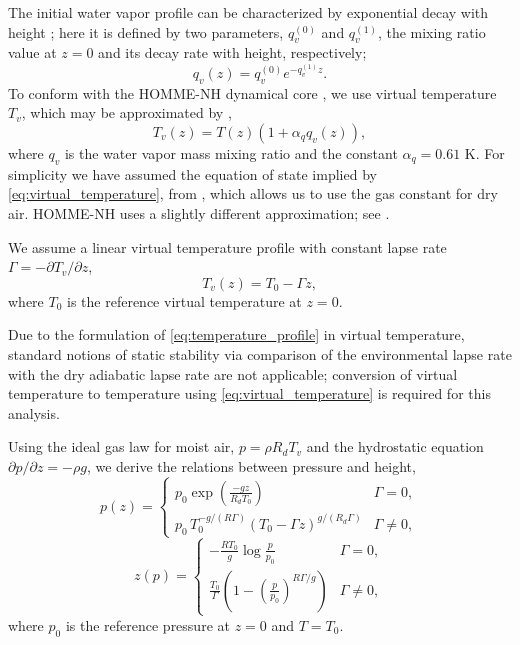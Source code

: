 The initial water vapor profile can be characterized by exponential decay with height \cite{Hashimoto2005,Palchetti2008}; here it is defined by two parameters, $q_v^{(0)}$ and $q_v^{(1)}$, the mixing ratio value at $z=0$ and its decay rate with height, respectively;
\begin{equation}\label{eq:qv_profile}
  q_v(z) = q_v^{(0)}e^{-q_v^{(1)}z}.
\end{equation}
To conform with the HOMME-NH dynamical core \cite{Taylor2020}, we use  virtual temperature $T_v$, which may be approximated by \cite[eqn.~(2.1)]{KlempWilhelmson1978},
\begin{equation}\label{eq:virtual_temperature}
  T_v(z) = T(z)(1+\alpha_q q_v(z)),
\end{equation}
where $q_v$ is the water vapor mass mixing ratio and the constant $\alpha_q = 0.61$ K.
For simplicity we have assumed the equation of state implied by \eqref{eq:virtual_temperature}, from \cite{KlempWilhelmson1978}, which allows us to use the gas constant for dry air.  
   HOMME-NH uses a slightly different approximation; see \cite[sec.~2.3]{Taylor2020}.
   
We assume a linear virtual temperature profile with constant lapse rate $\Gamma = -\partial T_v/\partial z$,
\begin{equation}\label{eq:temperature_profile}
  T_v(z) = T_0 - \Gamma z,
\end{equation}
where $T_0$ is the reference virtual temperature at $z=0$.  

\begin{rem}
  Due to the formulation of \eqref{eq:temperature_profile} in virtual temperature, standard notions of static stability via comparison of the environmental lapse rate with the dry adiabatic lapse rate are not applicable; conversion of virtual temperature to temperature using \eqref{eq:virtual_temperature} is required for this analysis.
\end{rem}

Using the ideal gas law for moist air, $p = \rho R_d T_v$ and the hydrostatic equation $\partial p/\partial z = -\rho g$, we derive the relations between pressure and height,
\begin{equation}\label{eq:hydrostatic_pressure_profile}
  p(z) = \begin{cases}
          p_0\exp\left(\frac{-g z}{R_dT_0}\right) & \Gamma = 0,\\[0.5em]
          p_0\, T_0^{-g/(R\Gamma)}\left(T_0 - \Gamma z\right)^{g/(R_d\Gamma)} & \Gamma \ne 0,
        \end{cases}
\end{equation}
\begin{equation}\label{eq:hydrostatic_height_profile}
  z(p) = \begin{cases}
         -\frac{R T_0}{g}\log\frac{p}{p_0} & \Gamma = 0,\\[0.5em]
         \frac{T_0}{\Gamma}\left(1 - \left(\frac{p}{p_0}\right)^{R\Gamma/g}\right) & \Gamma \ne 0,
       \end{cases}
\end{equation}
where $p_0$ is the reference pressure at $z=0$ and $T=T_0$.

